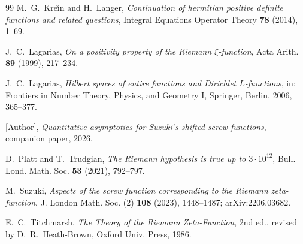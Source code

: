 \documentclass[11pt,reqno]{amsart}
\theoremstyle{plain}
\theoremstyle{definition}
\begin{document}
\begin{thebibliography}{99}
 M.~G.~Kre\u\i n and H.~Langer,
\emph{Continuation of hermitian positive definite functions and related questions},
Integral Equations Operator Theory \textbf{78} (2014), 1--69.

 J.~C.~Lagarias,
\emph{On a positivity property of the Riemann $\xi$-function},
Acta Arith. \textbf{89} (1999), 217--234.

 J.~C.~Lagarias,
\emph{Hilbert spaces of entire functions and Dirichlet $L$-functions},
in: Frontiers in Number Theory, Physics, and Geometry I, Springer, Berlin, 2006, 365--377.

 [Author],
\emph{Quantitative asymptotics for Suzuki's shifted screw functions},
companion paper, 2026.

 D.~Platt and T.~Trudgian,
\emph{The Riemann hypothesis is true up to $3\cdot10^{12}$},
Bull. Lond. Math. Soc. \textbf{53} (2021), 792--797.

 M.~Suzuki,
\emph{Aspects of the screw function corresponding to the Riemann zeta-function},
J. London Math. Soc. (2) \textbf{108} (2023), 1448--1487; arXiv:2206.03682.

 E.~C.~Titchmarsh,
\emph{The Theory of the Riemann Zeta-Function}, 2nd ed., revised by D.~R.~Heath-Brown,
Oxford Univ. Press, 1986.

\end{thebibliography}
\end{document}

